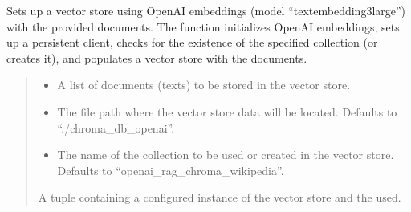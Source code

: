 \documentclass[letterpaper,10pt,english,openany,oneside]{sphinxmanual}
\begin{document}

\begin{fulllineitems}
\label{\detokenize{data_storage:tools.pipeline.setup_vectorstore_openai}}
\pysigstartsignatures
{}
\pysigstopsignatures
\sphinxAtStartPar
Sets up a vector store using OpenAI embeddings (model “text\sphinxhyphen{}embedding\sphinxhyphen{}3\sphinxhyphen{}large”) with the provided documents. The function initializes
OpenAI embeddings, sets up a persistent client, checks for the existence of the specified collection
(or creates it), and populates a vector store with the documents.
\begin{quote}\begin{description}
\begin{itemize}
\item {} 
\sphinxAtStartPar
{} \textendash{} A list of documents (texts) to be stored in the vector store.

\item {} 
\sphinxAtStartPar
{} \textendash{} The file path where the vector store data will be located. Defaults to “./chroma\_db\_openai”.

\item {} 
\sphinxAtStartPar
{} \textendash{} The name of the collection to be used or created in the vector store. 
Defaults to “openai\_rag\_chroma\_wikipedia”.

\end{itemize}

\sphinxAtStartPar
A tuple containing a configured instance of the  vector store and the  used.

\end{description}\end{quote}

\end{fulllineitems}
\end{document}
